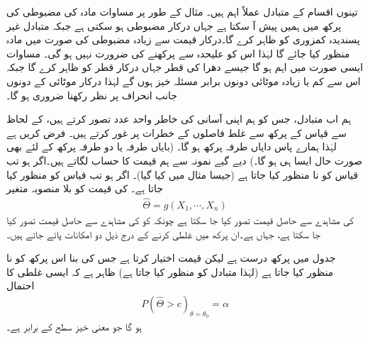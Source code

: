 تینوں اقسام کے متبادل عملاً اہم ہیں۔ مثال کے طور پر مساوات  مادہ کی  مضبوطی کی پرکھ میں ہمیں پیش آ سکتا ہے جہاں  درکار مضبوطی ہو سکتی ہے جبکہ متبادل غیر پسندیدہ کمزوری کو ظاہر کرے گا۔درکار قیمت سے زیادہ مضبوطی کی صورت میں مادہ منظور کیا جائے گا لہٰذا اس کو علیحدہ سے پرکھنے کی ضرورت نہیں ہو گی۔ مساوات  ایسی صورت میں اہم ہو گا جیسے دھرا کی قطر جہاں  درکار قطر کو ظاہر کرے گا جبکہ اس سے کم یا زیادہ موٹائی دونوں برابر مسئلہ خیز ہوں گے  لہٰذا درکار موٹائی کے دونوں جانب انحراف پر نظر رکھنا ضروری ہو گا۔

ہم اب متبادل، جس کو ہم اپنی آسانی کی خاطر واحد عدد  تصور کرتے ہیں،  کے لحاظ سے قیاس  کے پرکھ سے غلط فاصلوں کے خطرات پر غور کرتے ہیں۔ فرض کریں  ہے لہٰذا ہمارے پاس دایاں طرفہ پرکھ ہو گا۔ (بایاں طرفہ یا دو طرفہ پرکھ  کے لئے بھی صورت حال ایسا ہی ہو گا۔) دیے گیے نمونہ  سے ہم  قیمت   کا حساب لگاتے ہیں۔اگر  ہو تب قیاس کو نا منظور کیا جاتا ہے (جیسا مثال  میں کیا گیا)۔ اگر  ہو تب قیاس کو منظور کیا جاتا ہے۔ 
 کی قیمت کو بلا منصوبہ متغیر
\begin{align*}
\widehat{\Theta}=g(X_1,\cdots,X_n)
\end{align*}
کی مشاہدے سے حاصل قیمت تصور کیا جا سکتا ہے چونکہ  کو  کی مشاہدے سے حاصل قیمت تصور کیا جا سکتا ہے، جہاں  ہے۔ان پرکھ میں غلطی کرنے کے درج ذیل  دو امکانات  پائے جاتے ہیں۔

جدول  میں پرکھ درست ہے لیکن  قیمت  اختیار کرتا ہے جس کی بنا  اس پرکھ کو نا منظور کیا جاتا ہے (لہٰذا متبادل کو منظور کیا جاتا ہے) ظاہر ہے کہ ایسی غلطی کا احتمال
\begin{align}\label{مساوات_شماریات_غلطی_احتمال_الف}
P(\widehat{\Theta}>c)_{\theta=\theta_0}=\alpha
\end{align}
ہو گا جو معنی خیز سطح کے برابر ہے۔

